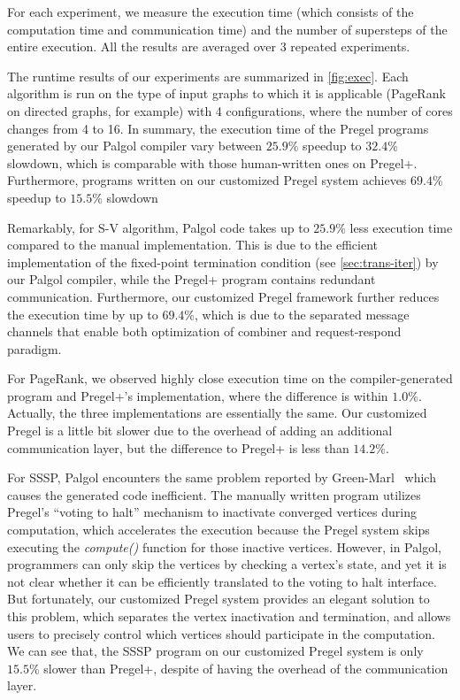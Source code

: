 \documentclass{sokendai_thesis} %
\begin{document}
For each experiment, we measure the execution time (which consists of the computation time and communication time) and the number of supersteps of the entire execution.
All the results are averaged over 3 repeated experiments.

The runtime results of our experiments are summarized in \autoref{fig:exec}.
Each algorithm is run on the type of input graphs to which it is applicable (PageRank on directed graphs, for example) with 4 configurations, where the number of cores changes from 4 to 16.
In summary, the execution time of the Pregel programs generated by our Palgol compiler vary between $25.9\%$ speedup to $32.4\%$ slowdown, which is comparable with those human-written ones on Pregel+.
Furthermore, programs written on our customized Pregel system achieves $69.4\%$ speedup to $15.5\%$ slowdown

Remarkably, for S-V algorithm, Palgol code takes up to $25.9\%$ less execution time compared to the manual implementation.
This is due to the efficient implementation of the fixed-point termination condition (see \autoref{sec:trans-iter}) by our Palgol compiler, while the  Pregel+ program contains redundant communication.
Furthermore, our customized Pregel framework further reduces the execution time by up to $69.4\%$, which is due to the separated message channels that enable both optimization of combiner and request-respond paradigm.

For PageRank, we observed highly close execution time on the compiler-generated program and Pregel+'s implementation, where the difference is within $1.0\%$.
Actually, the three implementations are essentially the same.
Our customized Pregel is a little bit slower due to the overhead of adding an additional communication layer, but the difference to Pregel+ is less than $14.2\%$.

For SSSP, Palgol encounters the same problem reported by Green-Marl~\cite{green14} which causes the generated code inefficient.
The manually written program utilizes Pregel's ``voting to halt'' mechanism to inactivate converged vertices during computation, which accelerates the execution because the Pregel system skips executing the \emph{compute()} function for those inactive vertices.
However, in Palgol, programmers can only skip the vertices by checking a vertex's state, and yet it is not clear whether it can be efficiently translated to the voting to halt interface.
But fortunately, our customized Pregel system provides an elegant solution to this problem, which separates the vertex inactivation and termination, and allows users to precisely control which vertices should participate in the computation.
We can see that, the SSSP program on our customized Pregel system is only $15.5\%$ slower than Pregel+, despite of having the overhead of the communication layer.
\end{document}

